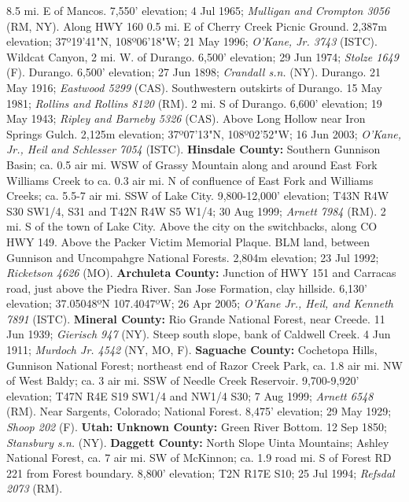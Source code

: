 8.5 mi. E of Mancos. 7,550' elevation; 4 Jul 1965;
\textit{Mulligan and Crompton 3056} (RM, NY).
Along HWY 160 0.5 mi. E of Cherry Creek Picnic Ground. 2,387m elevation;
37º19'41"N, 108º06'18"W; 21 May 1996; \textit{O'Kane, Jr. 3743} (ISTC).
Wildcat Canyon, 2 mi. W. of Durango. 6,500' elevation; 29 Jun 1974;
\textit{Stolze 1649} (F).
Durango. 6,500' elevation; 27 Jun 1898; \textit{Crandall s.n.} (NY).
Durango. 21 May 1916; \textit{Eastwood 5299} (CAS).
Southwestern outskirts of Durango. 15 May 1981;
\textit{Rollins and Rollins 8120} (RM).
2 mi. S of Durango. 6,600' elevation; 19 May 1943;
\textit{Ripley and Barneby 5326} (CAS).
Above Long Hollow near Iron Springs Gulch. 2,125m elevation;
37º07'13"N, 108º02'52"W; 16 Jun 2003;
\textit{O'Kane, Jr., Heil and Schlesser 7054} (ISTC).
  \textbf{Hinsdale County:}
Southern Gunnison Basin; ca. 0.5 air mi. WSW of Grassy Mountain along and around 
East Fork Williams Creek to ca. 0.3 air mi. N of confluence of East Fork and
Williams Creeks; ca. 5.5-7 air mi. SSW of Lake City. 9,800-12,000' elevation;
T43N R4W S30 SW1/4, S31 and T42N R4W S5 W1/4; 30 Aug 1999;
\textit{Arnett 7984} (RM).
2 mi. S of the town of Lake City. Above the city on the switchbacks, along 
CO HWY 149. Above the Packer Victim Memorial Plaque. BLM land, between 
Gunnison and Uncompahgre National Forests. 2,804m elevation; 23 Jul 1992; 
\textit{Ricketson 4626} (MO).
  \textbf{Archuleta County:}
Junction of HWY 151 and Carracas road, just above the Piedra River. San Jose
Formation, clay hillside. 6,130' elevation; 37.05048ºN 107.4047ºW;
26 Apr 2005; \textit{O'Kane Jr., Heil, and Kenneth 7891} (ISTC).
  \textbf{Mineral County:}
Rio Grande National Forest, near Creede. 11 Jun 1939; \textit{Gierisch 947} (NY).
Steep south slope, bank of Caldwell Creek. 4 Jun 1911;
\textit{Murdoch Jr. 4542} (NY, MO, F).
  \textbf{Saguache County:}
Cochetopa Hills, Gunnison National Forest; northeast end of Razor Creek Park,
ca. 1.8 air mi. NW of West Baldy; ca. 3 air mi. SSW of Needle Creek Reservoir.
9,700-9,920' elevation; T47N R4E S19 SW1/4 and NW1/4 S30;
7 Aug 1999; \textit{Arnett 6548} (RM).
Near Sargents, Colorado; National Forest. 8,475' elevation; 29 May 1929;
\textit{Shoop 202} (F).
  \textbf{Utah:}
  \textbf{Unknown County:}
Green River Bottom. 12 Sep 1850; \textit{Stansbury s.n.} (NY).
  \textbf{Daggett County:}
North Slope Uinta Mountains; Ashley National Forest, ca. 7 air mi. SW of
McKinnon; ca. 1.9 road mi. S of Forest RD 221 from Forest boundary.
8,800' elevation; T2N R17E S10; 25 Jul 1994; \textit{Refsdal 2073} (RM).
